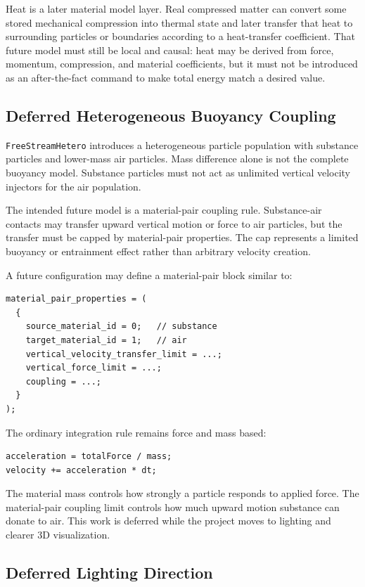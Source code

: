 Heat is a later material model layer.  Real compressed matter can convert some
stored mechanical compression into thermal state and later transfer that heat
to surrounding particles or boundaries according to a heat-transfer
coefficient.  That future model must still be local and causal: heat may be
derived from force, momentum, compression, and material coefficients, but it
must not be introduced as an after-the-fact command to make total energy match
a desired value.

\subsection{Deferred Heterogeneous Buoyancy Coupling}

\texttt{FreeStreamHetero} introduces a heterogeneous particle population with
substance particles and lower-mass air particles.  Mass difference alone is not
the complete buoyancy model.  Substance particles must not act as unlimited
vertical velocity injectors for the air population.

The intended future model is a material-pair coupling rule.  Substance-air
contacts may transfer upward vertical motion or force to air particles, but
the transfer must be capped by material-pair properties.  The cap represents a
limited buoyancy or entrainment effect rather than arbitrary velocity creation.

A future configuration may define a material-pair block similar to:

\begin{verbatim}
material_pair_properties = (
  {
    source_material_id = 0;   // substance
    target_material_id = 1;   // air
    vertical_velocity_transfer_limit = ...;
    vertical_force_limit = ...;
    coupling = ...;
  }
);
\end{verbatim}

The ordinary integration rule remains force and mass based:

\begin{verbatim}
acceleration = totalForce / mass;
velocity += acceleration * dt;
\end{verbatim}

The material mass controls how strongly a particle responds to applied force.
The material-pair coupling limit controls how much upward motion substance can
donate to air.  This work is deferred while the project moves to lighting and
clearer 3D visualization.

\subsection{Deferred Lighting Direction}

